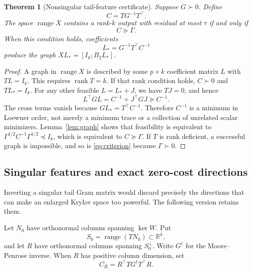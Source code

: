 \documentclass[11pt]{article}
\newtheorem{theorem}{Theorem}[section]
\theoremstyle{definition}
\newcommand{\R}{\mathbb R}
\newcommand{\ran}{\operatorname{range}}
\newcommand{\rank}{\operatorname{rank}}
\begin{document}
\begin{theorem}[Nonsingular tail-feature certificate]\label{thm:fullcertificate}
Suppose $G\succ0$. Define
\begin{equation}\label{eq:capacity}
 C=T G^{-1}T^\top.
\end{equation}
The space $\ran X$ contains a rank-$k$ output with residual at most $\tau$ if and only if
\begin{equation}\label{eq:criterion}
 C\succeq\Gamma.
\end{equation}
When this condition holds, coefficients
\[
 L_* = G^{-1}T^\top C^{-1}
\]
produce the graph $XL_*=[I_k;B_2L_*]$.
\end{theorem}
\begin{proof}
A graph in $\ran X$ is described by some $p\times k$ coefficient matrix $L$ with $TL=I_k$. This requires $\rank T=k$. If that rank condition holds, $C\succ0$ and $TL_*=I_k$. For any other feasible $L=L_*+J$, we have $TJ=0$, and hence
\[
 L^\top G L=C^{-1}+J^\top GJ\succeq C^{-1}.
\]
The cross terms vanish because $GL_*=T^\top C^{-1}$. Therefore $C^{-1}$ is a minimum in Loewner order, not merely a minimum trace or a collection of unrelated scalar minimizers. Lemma~\ref{lem:graph} shows that feasibility is equivalent to $\Gamma^{1/2}C^{-1}\Gamma^{1/2}\preceq I_k$, which is equivalent to $C\succeq\Gamma$. If $T$ is rank deficient, a successful graph is impossible, and so is \eqref{eq:criterion} because $\Gamma\succ0$.
\end{proof}

\subsection{Singular features and exact zero-cost directions}
Inverting a singular tail Gram matrix would discard precisely the directions that can make an enlarged Krylov space too powerful. The following version retains them.

Let $N_0$ have orthonormal columns spanning $\ker W$. Put
\[
 S_0=\ran(TN_0)\subset\R^k,
\]
and let $R$ have orthonormal columns spanning $S_0^\perp$. Write $G^\dagger$ for the Moore--Penrose inverse. When $R$ has positive column dimension, set
\begin{equation}\label{eq:projected-capacity}
 C_R=R^\top T G^\dagger T^\top R.
\end{equation}
\end{document}
